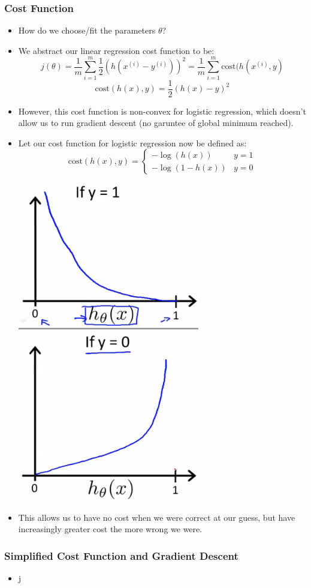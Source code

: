 \subsubsection{Cost Function}
\begin{itemize}[--]
	\item How do we choose/fit the parameters $\theta$?
	\item We abstract our linear regression cost function to be:
		$$j(\theta)=\frac{1}{m}\sum_{i=1}^{m}\frac{1}{2}(h(x^{(i)}-y^{(i)}))^2=\frac{1}{m}\sum_{i=1}^m\text{cost}(h(x^{(i)}, y)$$
		$$\text{cost}(h(x), y)=\frac{1}{2} (h(x)-y)^2$$

	\item However, this cost function is non-convex for logistic regression, which doesn't allow us to run gradient descent (no garuntee of global minimum reached).
	\item Let our cost function for logistic regression now be defined as:
	$$\text{cost}(h(x), y)=\begin{cases}
		-\log (h(x)) & y=1 \\
		-\log (1-h(x)) & y=0
	\end{cases}$$
	\begin{center}
		\includegraphics[scale=0.7,]{sections/cs229/w3/logisticcost.png}
		\newline
		\includegraphics[scale=0.]{sections/cs229/w3/logisticcost0.png}
	\end{center}

	\item This allows us to have no cost when we were correct at our guess, but have increasingly greater cost the more wrong we were.
\end{itemize}

\subsubsection{Simplified Cost Function and Gradient Descent}
\begin{itemize}[--]
	\item j
\end{itemize}
